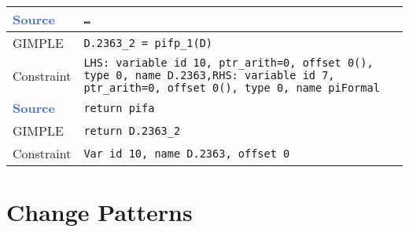 \begin{center}
\begin{longtable}{| m{10ex} | m{75ex} |}
            \hline
            \hline
            \textcolor{RoyalBlue}{\textbf{Source}} & \texttt{\ldots} \\ \hline
            GIMPLE & \texttt{D.2363\_2 = pifp\_1(D)} \\ \hline
            Constraint & \texttt{LHS: variable id 10, ptr\_arith=0, offset 0(), type 0, name D.2363,\newline RHS: variable id 7, ptr\_arith=0, offset 0(), type 0, name piFormal} \\
            \hline
            \hline
            \textcolor{RoyalBlue}{\textbf{Source}} & \texttt{return pifa} \\ \hline
            GIMPLE & \texttt{return D.2363\_2} \\ \hline
            Constraint & \texttt{Var id 10, name D.2363, offset 0} \\
            \hline
        \end{longtable}
    \end{center}

\section{Change Patterns}\label{sec:change-patterns}

%

